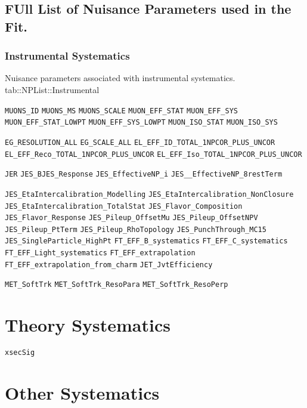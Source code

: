 \subsection{FUll List of Nuisance Parameters used in the Fit.}
\subsubsection{Instrumental Systematics}
{Nuisance parameters associated with instrumental systematics.}
{tab::NPList::Instrumental}

\texttt{MUONS_ID}
\texttt{MUONS_MS}
\texttt{MUONS_SCALE}
%
\texttt{MUON_EFF_STAT}
\texttt{MUON_EFF_SYS}
\texttt{MUON_EFF_STAT_LOWPT}
\texttt{MUON_EFF_SYS_LOWPT}
\texttt{MUON_ISO_STAT}
\texttt{MUON_ISO_SYS}

\texttt{EG_RESOLUTION_ALL}
\texttt{EG_SCALE_ALL}
\texttt{EL_EFF_ID_TOTAL_1NPCOR_PLUS_UNCOR}
\texttt{EL_EFF_Reco_TOTAL_1NPCOR_PLUS_UNCOR}
\texttt{EL_EFF_Iso_TOTAL_1NPCOR_PLUS_UNCOR}

\texttt{JER}
\texttt{JES_BJES_Response}
\texttt{JES_EffectiveNP_i}
\texttt{JES__EffectiveNP_8restTerm}

\texttt{JES_EtaIntercalibration_Modelling}
\texttt{JES_EtaIntercalibration_NonClosure}
\texttt{JES_EtaIntercalibration_TotalStat}
\texttt{JES_Flavor_Composition}
\texttt{JES_Flavor_Response}
\texttt{JES_Pileup_OffsetMu}
\texttt{JES_Pileup_OffsetNPV}
\texttt{JES_Pileup_PtTerm}
\texttt{JES_Pileup_RhoTopology}
\texttt{JES_PunchThrough_MC15}
\texttt{JES_SingleParticle_HighPt}
%
\texttt{FT_EFF_B_systematics}
\texttt{FT_EFF_C_systematics}
\texttt{FT_EFF_Light_systematics}
\texttt{FT_EFF_extrapolation}
\texttt{FT_EFF_extrapolation_from_charm}
\texttt{JET_JvtEfficiency}

\texttt{MET_SoftTrk}
\texttt{MET_SoftTrk_ResoPara}
\texttt{MET_SoftTrk_ResoPerp}




\section{Theory Systematics}


\texttt{xsecSig}

\section{Other Systematics}
